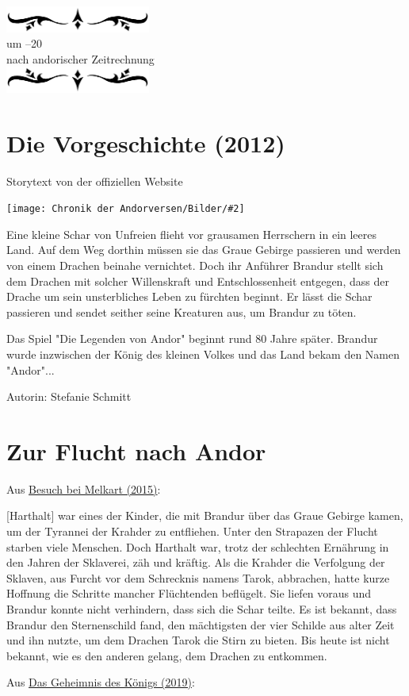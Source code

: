 \documentclass[10pt, a4paper, oneside]{book}
\newcommand{\fillbreak}{\vspace*{\fill}\columnbreak}
\newcommand{\storytext}[1]{%
    \section{#1}%
    \label{Storytext: #1}%
}
\newcommand{\refprodukt}[1]{\hyperref[Produkt: #1]{#1}}
\newcommand{\refstorytext}[1]{\hyperref[Storytext: #1]{#1}}
\newcommand{\bildmitts}[2][height=0.32\textwidth,width=0.48\textwidth,keepaspectratio]{%
    \begin{center}
        \texttt{[image: Chronik der Andorversen/Bilder/\#2]}
    \end{center}
}
\newcommand{\az}[1]{%
    \begin{center}
        \includegraphics[width=180px]{Chronik der Andorversen/verzierung1.png}\\
        {\Huge #1} \\
        {nach andorischer Zeitrechnung}\\
        \includegraphics[width=180px]{Chronik der Andorversen/verzierung2.png}
    \end{center}
    \extramarks{}{#1 a.Z.}
}
\begin{document}
\begin{multicols}{2}
\fillbreak
\az{um –20}
\storytext{Die Vorgeschichte (2012)}

\begin{center}
    Storytext von der offiziellen Website
\end{center}

\bildmitts{Die Vorgeschichte Bild 1.jpg}

Eine kleine Schar von Unfreien flieht vor grausamen Herrschern in ein leeres Land. Auf dem Weg dorthin müssen sie das Graue Gebirge passieren und werden von einem Drachen beinahe vernichtet. Doch ihr Anführer Brandur stellt sich dem Drachen mit solcher Willenskraft und Entschlossenheit entgegen, dass der Drache um sein unsterbliches Leben zu fürchten beginnt. Er lässt die Schar passieren und sendet seither seine Kreaturen aus, um Brandur zu töten.

Das Spiel "Die Legenden von Andor" beginnt rund 80 Jahre später. Brandur wurde inzwischen der König des kleinen Volkes und das Land bekam den Namen "Andor"...\bigskip

Autorin: Stefanie Schmitt



\fillbreak
\section{Zur Flucht nach Andor}

\begin{center}
    Aus \refstorytext{Besuch bei Melkart (2015)}:
\end{center}

[Harthalt] war eines der Kinder, die mit Brandur über das Graue Gebirge kamen, um der Tyrannei der Krahder zu entfliehen. Unter den Strapazen der Flucht starben viele Menschen. Doch Harthalt war, trotz der schlechten Ernährung in den Jahren der Sklaverei, zäh und kräftig. Als die Krahder die Verfolgung der Sklaven, aus Furcht vor dem Schrecknis namens Tarok, abbrachen, hatte kurze Hoffnung die Schritte mancher Flüchtenden beflügelt. Sie liefen voraus und Brandur konnte nicht verhindern, dass sich die Schar teilte. Es ist bekannt, dass Brandur den Sternenschild fand, den mächtigsten der vier Schilde aus alter Zeit und ihn nutzte, um dem Drachen Tarok die Stirn zu bieten. Bis heute ist nicht bekannt, wie es den anderen gelang, dem Drachen zu entkommen.

\begin{center}
    Aus \refprodukt{Das Geheimnis des Königs (2019)}:
\end{center}


\end{multicols}
\end{document}
